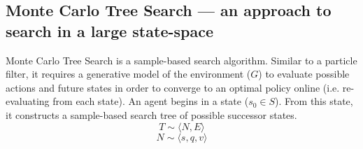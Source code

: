 \subsection{Monte Carlo Tree Search --- an approach to search in a large state-space}\label{MCTSDesc}
Monte Carlo Tree Search is a sample-based search algorithm. 
Similar to a particle filter, it requires a generative model of the environment ($G$) to evaluate possible actions and future states in order to converge to an optimal policy online (i.e. re-evaluating from each state). 
\newline \newline
An agent begins in a state ($s_0 \in S$). From this state, it constructs a sample-based search tree of possible successor states.
\begin{equation}
    T \sim \langle N, E \rangle
\end{equation} 
\begin{equation}
    N \sim \langle s, q, v \rangle 
\end{equation}

